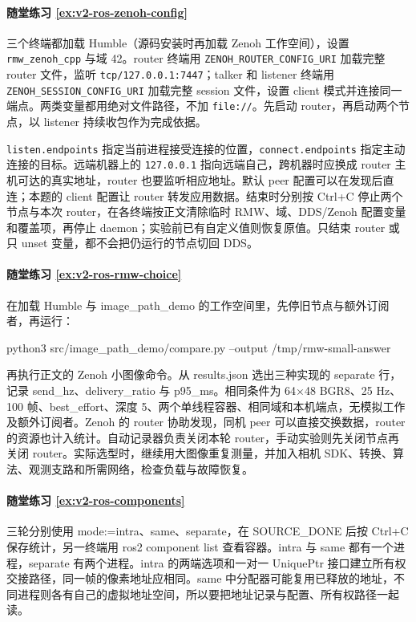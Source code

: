 \paragraph*{随堂练习 \ref{ex:v2-ros-zenoh-config}}
\begin{solution}
三个终端都加载 Humble（源码安装时再加载 Zenoh 工作空间），设置 \texttt{rmw\_zenoh\_cpp} 与域 42。router 终端用 \texttt{ZENOH\_ROUTER\_CONFIG\_URI} 加载完整 router 文件，监听 \nolinkurl{tcp/127.0.0.1:7447}；talker 和 listener 终端用 \texttt{ZENOH\_SESSION\_CONFIG\_URI} 加载完整 session 文件，设置 client 模式并连接同一端点。两类变量都用绝对文件路径，不加 \texttt{file://}。先启动 router，再启动两个节点，以 listener 持续收包作为完成依据。

\texttt{listen.endpoints} 指定当前进程接受连接的位置，\texttt{connect.endpoints} 指定主动连接的目标。远端机器上的 \texttt{127.0.0.1} 指向远端自己，跨机器时应换成 router 主机可达的真实地址，router 也要监听相应地址。默认 peer 配置可以在发现后直连；本题的 client 配置让 router 转发应用数据。结束时分别按 Ctrl+C 停止两个节点与本次 router，在各终端按正文清除临时 RMW、域、DDS/Zenoh 配置变量和覆盖项，再停止 daemon；实验前已有自定义值则恢复原值。只结束 router 或只 unset 变量，都不会把仍运行的节点切回 DDS。
\end{solution}

\paragraph*{随堂练习 \ref{ex:v2-ros-rmw-choice}}
\begin{solution}
在加载 Humble 与 image\_path\_demo 的工作空间里，先停旧节点与额外订阅者，再运行：
\begin{tbash}
python3 src/image_path_demo/compare.py --output /tmp/rmw-small-answer
\end{tbash}
再执行正文的 Zenoh 小图像命令。从 results.json 选出三种实现的 separate 行，记录 send\_hz、delivery\_ratio 与 p95\_ms。相同条件为 64×48 BGR8、25 Hz、100 帧、best\_effort、深度 5、两个单线程容器、相同域和本机端点，无模拟工作及额外订阅者。Zenoh 的 router 协助发现，同机 peer 可以直接交换数据，router 的资源也计入统计。自动记录器负责关闭本轮 router，手动实验则先关闭节点再关闭 router。实际选型时，继续用大图像重复测量，并加入相机 SDK、转换、算法、观测支路和所需网络，检查负载与故障恢复。
\end{solution}

\paragraph*{随堂练习 \ref{ex:v2-ros-components}}
\begin{solution}
三轮分别使用 mode:=intra、same、separate，在 SOURCE\_DONE 后按 Ctrl+C 保存统计，另一终端用 ros2 component list 查看容器。intra 与 same 都有一个进程，separate 有两个进程。intra 的两端选项和一对一 UniquePtr 接口建立所有权交接路径，同一帧的像素地址应相同。same 中分配器可能复用已释放的地址，不同进程则各有自己的虚拟地址空间，所以要把地址记录与配置、所有权路径一起读。
\end{solution}

